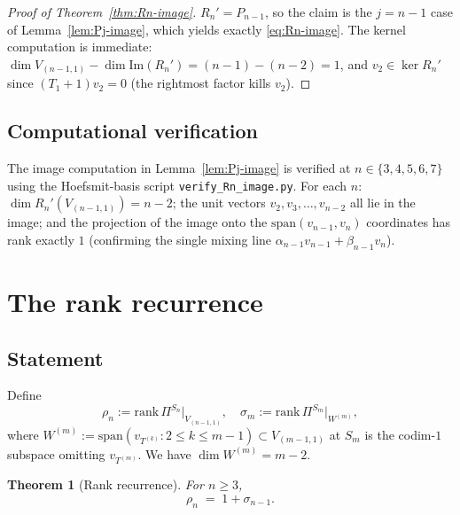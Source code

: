 \documentclass[11pt]{article}
\newtheorem{theorem}{Theorem}
\theoremstyle{definition}
\begin{document}
\begin{proof}[Proof of Theorem~\ref{thm:Rn-image}]
$R_n' = P_{n-1}$, so the claim is the $j = n-1$ case of
Lemma~\ref{lem:Pj-image}, which yields exactly \eqref{eq:Rn-image}.
The kernel computation is immediate: $\dim V_{(n-1,1)} - \dim
\mathrm{Im}(R_n') = (n-1) - (n-2) = 1$, and $v_2 \in \ker R_n'$ since
$(T_1{+}1) v_2 = 0$ (the rightmost factor kills $v_2$).
\end{proof}

\subsection{Computational verification}

The image computation in Lemma~\ref{lem:Pj-image} is verified at
$n \in \{3, 4, 5, 6, 7\}$ using the Hoefsmit-basis script
\texttt{verify\_Rn\_image.py}. For each $n$:
$\dim R_n'(V_{(n-1,1)}) = n - 2$;
the unit vectors $v_2, v_3, \ldots, v_{n-2}$ all lie in the image; and
the projection of the image onto the $\mathrm{span}(v_{n-1}, v_n)$
coordinates has rank exactly $1$ (confirming the single mixing line
$\alpha_{n-1} v_{n-1} + \beta_{n-1} v_n$).

\section{The rank recurrence}\label{sec:recurrence}

\subsection{Statement}

Define
\[
   \rho_n := \mathrm{rank}\,\Pi^{S_n}|_{V_{(n-1,1)}},
   \quad
   \sigma_m := \mathrm{rank}\,\Pi^{S_m}\bigl|_{W^{(m)}},
\]
where $W^{(m)} := \mathrm{span}(v_{T^{(k)}} : 2 \le k \le m-1)
\subset V_{(m-1,1)}$ at $S_m$ is the codim-$1$ subspace omitting
$v_{T^{(m)}}$. We have $\dim W^{(m)} = m - 2$.

\begin{theorem}[Rank recurrence]\label{thm:recurrence}
For $n \ge 3$,
\begin{equation}\label{eq:recurrence}
   \rho_n \;=\; 1 + \sigma_{n-1}.
\end{equation}
\end{theorem}
\end{document}
